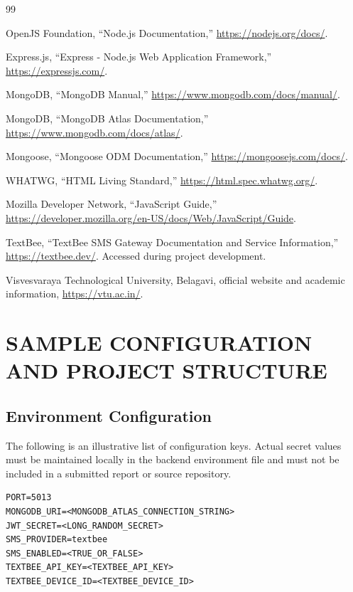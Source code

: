 \documentclass[12pt,a4paper,oneside]{report}
\begin{document}
\begin{thebibliography}{99}

OpenJS Foundation, ``Node.js Documentation,'' \url{https://nodejs.org/docs/}.

Express.js, ``Express - Node.js Web Application Framework,'' \url{https://expressjs.com/}.

MongoDB, ``MongoDB Manual,'' \url{https://www.mongodb.com/docs/manual/}.

MongoDB, ``MongoDB Atlas Documentation,'' \url{https://www.mongodb.com/docs/atlas/}.

Mongoose, ``Mongoose ODM Documentation,'' \url{https://mongoosejs.com/docs/}.

WHATWG, ``HTML Living Standard,'' \url{https://html.spec.whatwg.org/}.

Mozilla Developer Network, ``JavaScript Guide,'' \url{https://developer.mozilla.org/en-US/docs/Web/JavaScript/Guide}.

TextBee, ``TextBee SMS Gateway Documentation and Service Information,'' \url{https://textbee.dev/}. Accessed during project development.

Visvesvaraya Technological University, Belagavi, official website and academic information, \url{https://vtu.ac.in/}.

\end{thebibliography}

\appendix
\chapter{SAMPLE CONFIGURATION AND PROJECT STRUCTURE}

\section{Environment Configuration}
The following is an illustrative list of configuration keys. Actual secret values must be maintained locally in the backend environment file and must not be included in a submitted report or source repository.

\begin{lstlisting}[caption={Illustrative backend environment variables}]
PORT=5013
MONGODB_URI=<MONGODB_ATLAS_CONNECTION_STRING>
JWT_SECRET=<LONG_RANDOM_SECRET>
SMS_PROVIDER=textbee
SMS_ENABLED=<TRUE_OR_FALSE>
TEXTBEE_API_KEY=<TEXTBEE_API_KEY>
TEXTBEE_DEVICE_ID=<TEXTBEE_DEVICE_ID>
\end{lstlisting}
\end{document}
